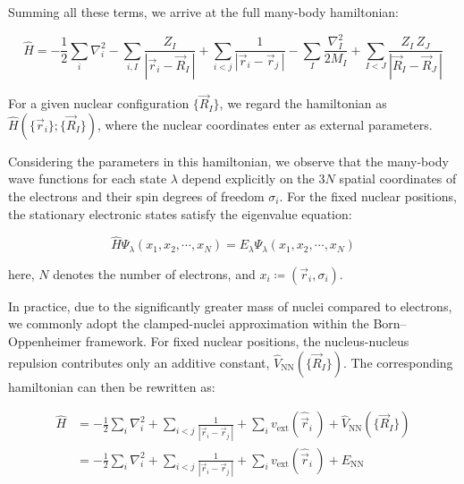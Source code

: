 Summing all these terms, we arrive at the full many-body hamiltonian:

\begin{equation}
    \hat{H}=-\frac{1}{2}\sum_i\nabla_i^2
    -\sum_{i,I}\frac{Z_I}{|\vec{r}_i-\vec{R}_I\,|}
    +\sum_{i<j}\frac{1}{|\vec{r}_i-\vec{r}_j\,|}
    -\sum_I\frac{\nabla_I^2}{2M_I}
    +\sum_{I<J}\frac{Z_I\,Z_J}{|\vec{R}_I-\vec{R}_J\,|}
\label{full_many-body_hamiltonian}
\end{equation}

For a given nuclear configuration $\{\vec{R}_I\}$, we regard the hamiltonian as $\hat{H}(\{\vec{r}_i\};\{\vec{R}_I\})$, where the nuclear coordinates enter as external parameters.

Considering the parameters in this hamiltonian, we observe that the many-body wave functions for each state $\lambda$ depend explicitly on the $3N$ spatial coordinates of the electrons and their spin degrees of freedom $\sigma_i$.
For the fixed nuclear positions, the stationary electronic states satisfy the eigenvalue equation:

\begin{equation}
    \hat{H}\Psi_\lambda(x_1,x_2,\cdots,x_N)
    = E_\lambda\Psi_\lambda(x_1,x_2,\cdots,x_N)
\label{many-body_hamiltonian_argument}
\end{equation}

here, $N$ denotes the number of electrons, and $x_i\coloneqq(\vec{r}_i,\sigma_i)$.

In practice, due to the significantly greater mass of nuclei compared to electrons, we commonly adopt the clamped-nuclei approximation within the Born--Oppenheimer framework.
For fixed nuclear positions, the nucleus-nucleus repulsion contributes only an additive constant, $\hat{V}_\mathrm{NN}(\{\vec{R}_I\})$.
The corresponding hamiltonian can then be rewritten as:

\begin{equation}
\begin{aligned}
\hat{H}
    &=-\frac{1}{2}\sum_i\nabla_i^2
    +\sum_{i<j}\frac{1}{|\vec{r}_i-\vec{r}_j\,|}
    +\sum_i v_\mathrm{ext}(\hat{\vec{r}}_i\,)+\hat{V}_\mathrm{NN}(\{\vec{R}_I\}) \\
    &=-\frac{1}{2}\sum_i\nabla_i^2
    +\sum_{i<j}\frac{1}{|\vec{r}_i-\vec{r}_j\,|}
    +\sum_i v_\mathrm{ext}(\hat{\vec{r}}_i\,)+E_\mathrm{NN}
\end{aligned}
\label{clamped_nuclei_many_body_hamiltonian}
\end{equation}

